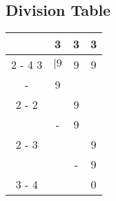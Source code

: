 \documentclass{article}%
\begin{document}
%
\normalsize%
\subsection{Division Table}%
\label{subsec:DivisionTable}%
\begin{tabular}{c@{\,}c@{\,}c@{\,}c@{\,}}%
\phantom{3}&3&3&3\\%
\cline{2%
-%
4}%
3&$|9$&9&9\\%
-&9&\phantom{3}&\phantom{3}\\%
\cline{2%
-%
2}%
\phantom{3}&\phantom{3}&9&\phantom{3}\\%
\phantom{3}&-&9&\phantom{3}\\%
\cline{2%
-%
3}%
\phantom{3}&\phantom{3}&\phantom{3}&9\\%
\phantom{3}&\phantom{3}&-&9\\%
\cline{3%
-%
4}%
\phantom{3}&\phantom{3}&\phantom{3}&0\\%
\end{tabular}

%
\end{document}
